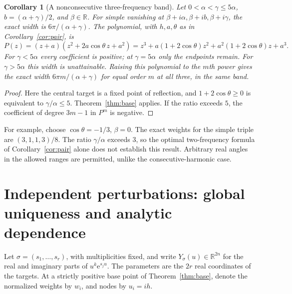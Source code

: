 \documentclass[11pt]{article}
\newtheorem{corollary}[theorem]{Corollary}
\theoremstyle{remark}\newtheorem{remark}[theorem]{Remark}
\newcommand{\R}{\mathbb R}\newcommand{\C}{\mathbb C}\newcommand{\supp}{\operatorname{supp}}
\newcommand{\e}{\mathrm e}\newcommand{\norm}[1]{\left\|#1\right\|}
\begin{document}
\begin{corollary}[A nonconsecutive three-frequency band]\label{cor:triple}
Let $0<\alpha<\gamma\le5\alpha$, $b=(\alpha+\gamma)/2$, and $\beta\in\R$. For simple vanishing at $\beta+i\alpha,\beta+ib,\beta+i\gamma$, the exact width is $6\pi/(\alpha+\gamma)$. The polynomial, with $h,a,\theta$ as in Corollary~\ref{cor:pair}, is
\[
 P(z)=(z+a)(z^2+2a\cos\theta\,z+a^2)
 =z^3+a(1+2\cos\theta)z^2+a^2(1+2\cos\theta)z+a^3.
\]
For $\gamma<5\alpha$ every coefficient is positive; at $\gamma=5\alpha$ only the endpoints remain. For $\gamma>5\alpha$ this width is unattainable. Raising this polynomial to the $m$th power gives the exact width $6\pi m/(\alpha+\gamma)$ for equal order $m$ at all three, in the same band.
\end{corollary}
\begin{proof}
Here the central target is a fixed point of reflection, and $1+2\cos\theta\ge0$ is equivalent to $\gamma/\alpha\le5$. Theorem~\ref{thm:base} applies. If the ratio exceeds $5$, the coefficient of degree $3m-1$ in $P^m$ is negative.
\end{proof}
For example, choose $\cos\theta=-1/3$, $\beta=0$. The exact weights for the simple triple are $(3,1,1,3)/8$. The ratio $\gamma/\alpha$ exceeds $3$, so the optimal two-frequency formula of Corollary~\ref{cor:pair} alone does not establish this result. Arbitrary real angles in the allowed ranges are permitted, unlike the consecutive-harmonic case.

\section{Independent perturbations: global uniqueness and analytic dependence}
Let $\sigma=(s_1,\ldots,s_r)$, with multiplicities fixed, and write $Y_\sigma(u)\in\R^{2n}$ for the real and imaginary parts of $u^k\e^{s_j u}$. The parameters are the $2r$ real coordinates of the targets. At a strictly positive base point of Theorem~\ref{thm:base}, denote the normalized weights by $w_i$, and nodes by $u_i=ih$.
\end{document}
